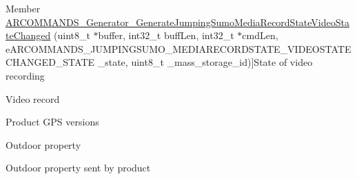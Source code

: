 \begin{DoxyRefList}
\hypertarget{deprecated__deprecated000037}{}%
Member \hyperlink{_a_r_c_o_m_m_a_n_d_s___generator_8h_a7fbf3fd876521b397f941955435fba9c}{A\+R\+C\+O\+M\+M\+A\+N\+D\+S\+\_\+\+Generator\+\_\+\+Generate\+Jumping\+Sumo\+Media\+Record\+State\+Video\+State\+Changed} (uint8\+\_\+t $\ast$buffer, int32\+\_\+t buff\+Len, int32\+\_\+t $\ast$cmd\+Len, e\+A\+R\+C\+O\+M\+M\+A\+N\+D\+S\+\_\+\+J\+U\+M\+P\+I\+N\+G\+S\+U\+M\+O\+\_\+\+M\+E\+D\+I\+A\+R\+E\+C\+O\+R\+D\+S\+T\+A\+T\+E\+\_\+\+V\+I\+D\+E\+O\+S\+T\+A\+T\+E\+C\+H\+A\+N\+G\+E\+D\+\_\+\+S\+T\+A\+TE \+\_\+state, uint8\+\_\+t \+\_\+mass\+\_\+storage\+\_\+id)]State of video recording  
\item[\label{deprecated__deprecated000033}%
\hypertarget{deprecated__deprecated000033}{}%
Member \hyperlink{_a_r_c_o_m_m_a_n_d_s___generator_8h_a286797269a6b8ca686c57d33397fdeb1}{A\+R\+C\+O\+M\+M\+A\+N\+D\+S\+\_\+\+Generator\+\_\+\+Generate\+Jumping\+Sumo\+Media\+Record\+Video} (uint8\+\_\+t $\ast$buffer, int32\+\_\+t buff\+Len, int32\+\_\+t $\ast$cmd\+Len, e\+A\+R\+C\+O\+M\+M\+A\+N\+D\+S\+\_\+\+J\+U\+M\+P\+I\+N\+G\+S\+U\+M\+O\+\_\+\+M\+E\+D\+I\+A\+R\+E\+C\+O\+R\+D\+\_\+\+V\+I\+D\+E\+O\+\_\+\+R\+E\+C\+O\+RD \+\_\+record, uint8\+\_\+t \+\_\+mass\+\_\+storage\+\_\+id)]Video record  
\item[\label{deprecated__deprecated000035}%
\hypertarget{deprecated__deprecated000035}{}%
Member \hyperlink{_a_r_c_o_m_m_a_n_d_s___generator_8h_abcab17e629998ace9fba26d2edf6fc6e}{A\+R\+C\+O\+M\+M\+A\+N\+D\+S\+\_\+\+Generator\+\_\+\+Generate\+Jumping\+Sumo\+Settings\+State\+Product\+G\+P\+S\+Version\+Changed} (uint8\+\_\+t $\ast$buffer, int32\+\_\+t buff\+Len, int32\+\_\+t $\ast$cmd\+Len, const char $\ast$\+\_\+software, const char $\ast$\+\_\+hardware)]Product G\+PS versions  
\item[\label{deprecated__deprecated000034}%
\hypertarget{deprecated__deprecated000034}{}%
Member \hyperlink{_a_r_c_o_m_m_a_n_d_s___generator_8h_a10aec95339d44fca0b9a3388d4011439}{A\+R\+C\+O\+M\+M\+A\+N\+D\+S\+\_\+\+Generator\+\_\+\+Generate\+Jumping\+Sumo\+Speed\+Settings\+Outdoor} (uint8\+\_\+t $\ast$buffer, int32\+\_\+t buff\+Len, int32\+\_\+t $\ast$cmd\+Len, uint8\+\_\+t \+\_\+outdoor)]Outdoor property  
\item[\label{deprecated__deprecated000038}%
\hypertarget{deprecated__deprecated000038}{}%
Member \hyperlink{_a_r_c_o_m_m_a_n_d_s___generator_8h_a587c10eac5d8c0ed5d8f33a161c0f468}{A\+R\+C\+O\+M\+M\+A\+N\+D\+S\+\_\+\+Generator\+\_\+\+Generate\+Jumping\+Sumo\+Speed\+Settings\+State\+Outdoor\+Changed} (uint8\+\_\+t $\ast$buffer, int32\+\_\+t buff\+Len, int32\+\_\+t $\ast$cmd\+Len, uint8\+\_\+t \+\_\+outdoor)]Outdoor property sent by product  

\end{DoxyRefList}
